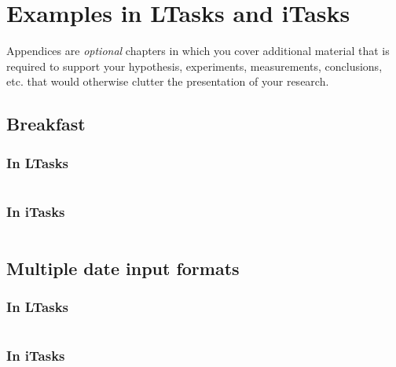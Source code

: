 \chapter{Examples in LTasks and iTasks}\label{appendix}
Appendices are \emph{optional} chapters in which you cover additional material that is required to support your
hypothesis, experiments, measurements, conclusions, etc. that would otherwise
clutter the presentation of your research.

\section{Breakfast}\label{appendix-breakfast}
\subsection{In LTasks}
\inputminted{lua}{examples/breakfast.lua}

\subsection{In iTasks}
\inputminted{clean}{examples/breakfast.icl}

\section{Multiple date input formats}\label{appendix-dates}
\subsection{In LTasks}
\inputminted{lua}{examples/date.lua}

\subsection{In iTasks}

